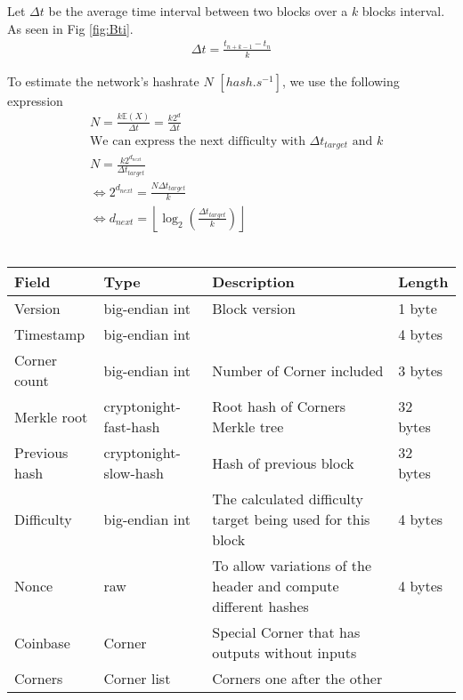 \documentclass[a4paper,10pt]{article}
\begin{document}
            Let $\Delta t$ be the average time interval between two blocks over a $k$ blocks interval.
            As seen in Fig \ref{fig:Bti}.
            \begin {align*}
             \Delta t = \frac{t_{n+k-1} - t_n}{k}
            \end {align*}

            
            To estimate the network's hashrate $N$ $[hash.s^{-1}]$, we use the following expression\\
            
            
            \begin {align*}
                &\text{}N = \frac{k\mathbb{E}(X)}{\Delta t} = \frac{k2^d}{\Delta t}\\
                &\text{We can express the next difficulty with ${\Delta t}_{target}$ and $k$}\\
                &N = \frac{k2^{d_{next}}}{{\Delta t}_{target}}\\
                &\Leftrightarrow 2^{d_{next}} = \frac{N{\Delta t}_{target}}{k}\\
                &\Leftrightarrow d_{next} = \left\lfloor\log_2\left(\frac{{\Delta t}_{target}}{k}\right)\right\rfloor
            \end {align*}\\
            
            
            \noindent\begin{tabularx}{\textwidth}{|l|l|X|l|}
            \hline Field & Type & Description & Length \\ \hline
            \hline Version & big-endian int & Block version & 1 byte \\
            \hline Timestamp & big-endian int & & 4 bytes\\
            \hline Corner count & big-endian int & Number of Corner included & 3 bytes\\
            \hline Merkle root & cryptonight-fast-hash & Root hash of Corners Merkle tree & 32 bytes\\
            \hline Previous hash & cryptonight-slow-hash & Hash of previous block & 32 bytes\\
            \hline Difficulty & big-endian int & The calculated difficulty target being used for this block & 4 bytes\\
            \hline Nonce & raw & To allow variations of the header and compute different hashes & 4 bytes \\
            \hline
            \hline Coinbase & Corner & Special Corner that has outputs without inputs & \\
            \hline Corners & Corner list & Corners one after the other & \\
            \hline
            \end{tabularx}
        
\end{document}
